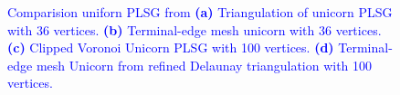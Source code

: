 \documentclass[pdflatex,sn-mathphys]{sn-jnl}%
\theoremstyle{thmstyleone}%
\theoremstyle{thmstyletwo}%
\theoremstyle{thmstylethree}%
\begin{document}
\begin{figure}[!h]
\centering     %
{}%
%
%

\caption{\textcolor{blue}{Comparision uniforn PLSG from \cite{AlejandroNUA2019} \textbf{(a)} Triangulation of unicorn PLSG with 36 vertices. \textbf{(b)} Terminal-edge mesh unicorn with 36 vertices. \textbf{(c)} Clipped Voronoi Unicorn PLSG with 100 vertices. \textbf{(d)} Terminal-edge mesh Unicorn from refined Delaunay triangulation with 100 vertices.}}
\label{figs:univornPSLG} 
\end{figure}
\end{document}
